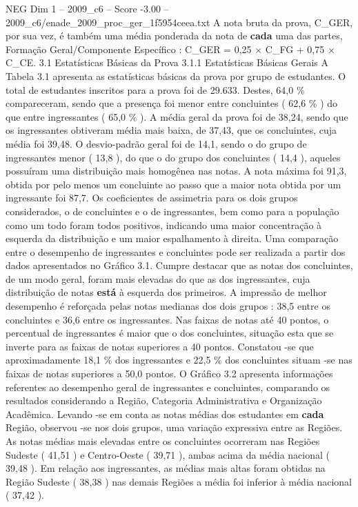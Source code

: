 \begin{textsample}{NEG Dim 1 – 2009\_c6 – Score -3.00 – 2009\_c6/enade\_2009\_proc\_ger\_1f5954ceea.txt}
A nota bruta da prova, C\_GER, por sua vez, é também uma média ponderada da nota de \textbf{cada} uma das partes, Formação Geral/Componente Específico : C\_GER = 0,25 × C\_FG + 0,75 × C\_CE. 3.1 Estatísticas Básicas da Prova 3.1.1 Estatísticas Básicas Gerais A Tabela 3.1 apresenta as estatísticas básicas da prova por grupo de estudantes.
O total de estudantes inscritos para a prova foi de 29.633.
Destes, 64,0 \% compareceram, sendo que a presença foi menor entre concluintes ( 62,6 \% ) do que entre ingressantes ( 65,0 \% ).
A média geral da prova foi de 38,24, sendo que os ingressantes obtiveram média mais baixa, de 37,43, que os concluintes, cuja média foi 39,48.
O desvio-padrão geral foi de 14,1, sendo o do grupo de ingressantes menor ( 13,8 ), do que o do grupo dos concluintes ( 14,4 ), aqueles possuíram uma distribuição mais homogênea nas notas.
A nota máxima foi 91,3, obtida por pelo menos um concluinte ao passo que a maior nota obtida por um ingressante foi 87,7.
Os coeficientes de assimetria para os dois grupos considerados, o de concluintes e o de ingressantes, bem como para a população como um todo foram todos positivos, indicando uma maior concentração à esquerda da distribuição e um maior espalhamento à direita.
Uma comparação entre o desempenho de ingressantes e concluintes pode ser realizada a partir dos dados apresentados no Gráfico 3.1.
Cumpre destacar que as notas dos concluintes, de um modo geral, foram mais elevadas do que as dos ingressantes, cuja distribuição de notas \textbf{está} à esquerda dos primeiros.
A impressão de melhor desempenho é reforçada pelas notas medianas dos dois grupos : 38,5 entre os concluintes e 36,6 entre os ingressantes.
Nas faixas de notas até 40 pontos, o percentual de ingressantes é maior que o dos concluintes, situação esta que se inverte para as faixas de notas superiores a 40 pontos.
Constatou -se que aproximadamente 18,1 \% dos ingressantes e 22,5 \% dos concluintes situam -se nas faixas de notas superiores a 50,0 pontos.
O Gráfico 3.2 apresenta informações referentes ao desempenho geral de ingressantes e concluintes, comparando os resultados considerando a Região, Categoria Administrativa e Organização Acadêmica.
Levando -se em conta as notas médias dos estudantes em \textbf{cada} Região, observou -se nos dois grupos, uma variação expressiva entre as Regiões.
As notas médias mais elevadas entre os concluintes ocorreram nas Regiões Sudeste ( 41,51 ) e Centro-Oeste ( 39,71 ), ambas acima da média nacional ( 39,48 ).
Em relação aos ingressantes, as médias mais altas foram obtidas na Região Sudeste ( 38,38 ) nas demais Regiões a média foi inferior à média nacional ( 37,42 ).

\end{textsample}
